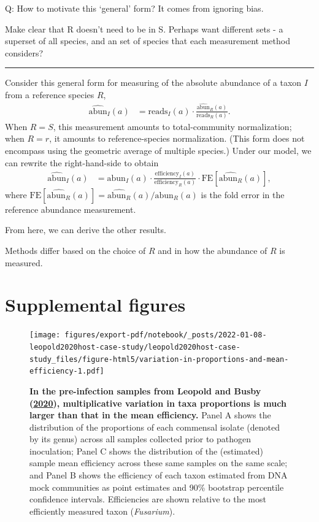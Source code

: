 \documentclass[
]{article}
\begin{document}
Q: How to motivate this `general' form?
It comes from ignoring bias.

Make clear that R doesn't need to be in S. Perhaps want different sets - a superset of all species, and an set of species that each measurement method considers?

\begin{center}\rule{0.5\linewidth}{0.5pt}\end{center}

Consider this general form for measuring of the absolute abundance of a taxon \(I\) from a reference species \(R\),
\begin{align}
  \widehat{\text{abun}}_{I}(a) 
  &= \text{reads}_{I}(a) \cdot \frac{\widehat{\text{abun}}_{R}(a)}{\text{reads}_{R}(a)}.
\end{align}
When \(R = S\), this measurement amounts to total-community normalization; when \(R=r\), it amounts to reference-species normalization.
(This form does not encompass using the geometric average of multiple species.)
Under our model, we can rewrite the right-hand-side to obtain
\begin{align}
  \widehat{\text{abun}}_{I}(a) 
  &= \text{abun}_{I}(a) \cdot \frac{\text{efficiency}_{I}(a)}{\text{efficiency}_{R}(a)}
  \cdot \text{FE}\left[\widehat{\text{abun}_R}(a)\right],
\end{align}
where \(\text{FE}\left[\widehat{\text{abun}_R}(a)\right] = \widehat{\text{abun}_R}(a) / \text{abun}_R(a)\) is the fold error in the reference abundance measurement.

From here, we can derive the other results.

Methods differ based on the choice of \(R\) and in how the abundance of \(R\) is measured.

\hypertarget{supplemental-figures}{%
\section{Supplemental figures}\label{supplemental-figures}}

\begin{figure}
\centering
\texttt{[image: figures/export-pdf/notebook/\_posts/2022-01-08-leopold2020host-case-study/leopold2020host-case-study\_files/figure-html5/variation-in-proportions-and-mean-efficiency-1.pdf]}
\caption{\label{fig:leopold2020host-variation}\textbf{In the pre-infection samples from Leopold and Busby (\protect\hyperlink{ref-leopold2020host}{2020}), multiplicative variation in taxa proportions is much larger than that in the mean efficiency.} Panel A shows the distribution of the proportions of each commensal isolate (denoted by its genus) across all samples collected prior to pathogen inoculation; Panel C shows the distribution of the (estimated) sample mean efficiency across these same samples on the same scale; and Panel B shows the efficiency of each taxon estimated from DNA mock communities as point estimates and 90\% bootstrap percentile confidence intervals. Efficiencies are shown relative to the most efficiently measured taxon (\emph{Fusarium}).}
\end{figure}
\end{document}
